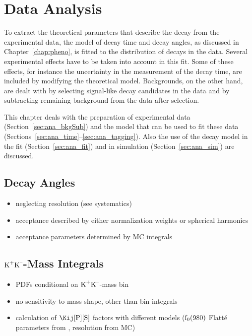 \chapter{Data Analysis}
\label{chap:ana}


To extract the theoretical parameters that describe the \BstoJpsiKK{} decay from the experimental data, the model of decay time and decay
angles, as discussed in Chapter~\ref{chap:pheno}, is fitted to the distribution of decays in the data. Several experimental effects have to
be taken into account in this fit. Some of these effects, for instance the uncertainty in the measurement of the decay time, are included
by modifying the theoretical model. Backgrounds, on the other hand, are dealt with by selecting signal-like decay candidates in the data
and by subtracting remaining background from the data after selection.

This chapter deals with the preparation of experimental data (Section~\ref{sec:ana_bkgSub}) and the model that can be used to fit these
data (Sections~\ref{sec:ana_time}--\ref{sec:ana_tagging}). Also the use of the decay model in the fit (Section~\ref{sec:ana_fit}) and in
simulation (Section~\ref{sec:ana_sim}) are discussed.





\section{Decay Angles}
\label{sec:ana_angles}
\begin{itemize}
  \item neglecting resolution (see systematics)
  \item acceptance described by either normalization weights or spherical harmonics
  \item acceptance parameters determined by MC integrals
\end{itemize}

\section{\texorpdfstring{$\text{K}^\text{+}\text{K}^\text{--}$}{KK}-Mass Integrals}
\label{sec:ana_KKIntegrals}

\begin{itemize}
  \item PDFs conditional on $\text{K}^\text{+}\text{K}^\text{--}$-mass bin
  \item no sensitivity to mass shape, other than bin integrals
  \item calculation of $\CSP$ factors with different models
        ($\text{f}_\text{0}\text{(980)}$ Flatt\'e parameters from \cite{Ablikim:2004wn}, resolution from MC)
\end{itemize}

